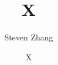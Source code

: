 \documentclass[10pt]{article}
\begin{document}
	\title{X} %
	\author{Steven Zhang}
	\date{X} %
	\maketitle
	
	\begin{enumerate}

	\end{enumerate}
\end{document}
